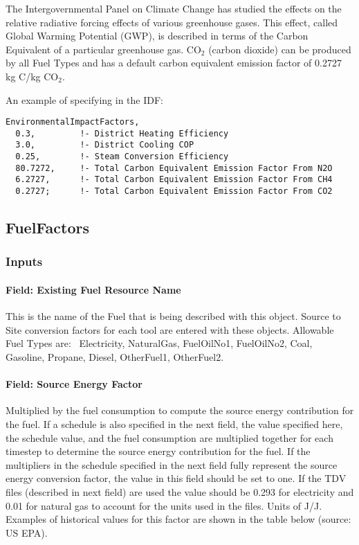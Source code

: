 The Intergovernmental Panel on Climate Change has studied the effects on the relative radiative forcing effects of various greenhouse gases. This effect, called Global Warming Potential (GWP), is described in terms of the Carbon Equivalent of a particular greenhouse gas. CO\(_{2}\) (carbon dioxide) can be produced by all Fuel Types and has a default carbon equivalent emission factor of 0.2727 kg C/kg CO\(_{2}\).

An example of specifying in the IDF:

\begin{lstlisting}
EnvironmentalImpactFactors,
  0.3,         !- District Heating Efficiency
  3.0,         !- District Cooling COP
  0.25,        !- Steam Conversion Efficiency
  80.7272,     !- Total Carbon Equivalent Emission Factor From N2O
  6.2727,      !- Total Carbon Equivalent Emission Factor From CH4
  0.2727;      !- Total Carbon Equivalent Emission Factor From CO2
\end{lstlisting}

\subsection{FuelFactors}\label{fuelfactors}

\subsubsection{Inputs}\label{inputs-11-015}

\paragraph{Field: Existing Fuel Resource Name}\label{field-existing-fuel-resource-name}

This is the name of the Fuel that is being described with this object. Source to Site conversion factors for each tool are entered with these objects. Allowable Fuel Types are:~ Electricity, NaturalGas, FuelOilNo1, FuelOilNo2, Coal, Gasoline, Propane, Diesel, OtherFuel1, OtherFuel2.

\paragraph{Field: Source Energy Factor}\label{field-source-energy-factor}

Multiplied by the fuel consumption to compute the source energy contribution for the fuel. If a schedule is also specified in the next field, the value specified here, the schedule value, and the fuel consumption are multiplied together for each timestep to determine the source energy contribution for the fuel. If the multipliers in the schedule specified in the next field fully represent the source energy conversion factor, the value in this field should be set to one. If the TDV files (described in next field) are used the value should be 0.293 for electricity and 0.01 for natural gas to account for the units used in the files. Units of J/J.  Examples of historical values for this factor are shown in the table below (source: US EPA).

